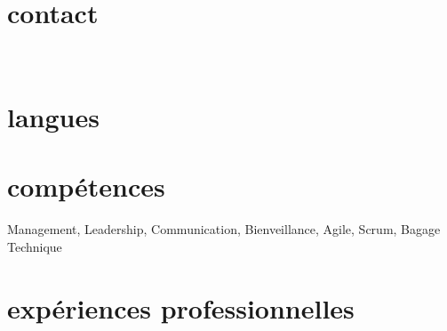 \documentclass{friggeri-cv} 	%
\begin{document}


\begin{aside} %
\section{contact}
\myAddress
~
\myPhoneNumber
\myReferences
\section{langues}
\myLanguages
\section{compétences}
Management, Leadership,
Communication,
Bienveillance,
Agile, Scrum,
Bagage Technique
\end{aside}

\section{expériences professionnelles}
\end{document}
